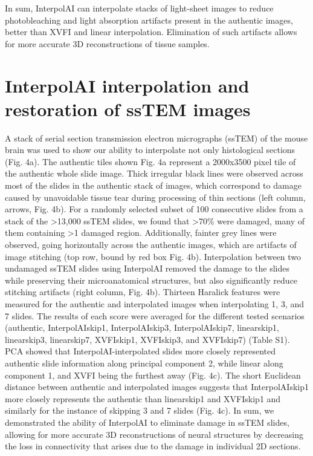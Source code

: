 \begin{refsection}
    In sum, InterpolAI can interpolate stacks of light-sheet images to reduce photobleaching and light absorption artifacts present in the authentic images, better than XVFI and linear interpolation. Elimination of such artifacts allows for more accurate 3D reconstructions of tissue samples.
    
    \section{InterpolAI interpolation and restoration of ssTEM images}
    A stack of serial section transmission electron micrographs (ssTEM) of the mouse brain was used to show our ability to interpolate not only histological sections (Fig. 4a). The authentic tiles shown Fig. 4a represent a 2000x3500 pixel tile of the authentic whole slide image. Thick irregular black lines were observed across most of the slides in the authentic stack of images, which correspond to damage caused by unavoidable tissue tear during processing of thin sections (left column, arrows, Fig. 4b). For a randomly selected subset of 100 consecutive slides from a stack of the >13,000 ssTEM slides, we found that >70\% were damaged, many of them containing >1 damaged region. Additionally, fainter grey lines were observed, going horizontally across the authentic images, which are artifacts of image stitching (top row, bound by red box Fig. 4b). 
    Interpolation between two undamaged ssTEM slides using InterpolAI removed the damage to the slides while preserving their microanatomical structures, but also significantly reduce stitching artifacts (right column, Fig. 4b).
    Thirteen Haralick features were measured for the authentic and interpolated images when interpolating 1, 3, and 7 slides. The results of each score were averaged for the different tested scenarios (authentic, InterpolAIskip1, InterpolAIskip3, InterpolAIskip7, linearskip1, linearskip3, linearskip7, XVFIskip1, XVFIskip3, and XVFIskip7) (Table S1). PCA showed that InterpolAI-interpolated slides more closely represented authentic slide information along principal component 2, while linear along component 1, and XVFI being the furthest away (Fig. 4c). The short Euclidean distance between authentic and interpolated images suggests that InterpolAIskip1 more closely represents the authentic than linearskip1 and XVFIskip1 and similarly for the instance of skipping 3 and 7 slides (Fig. 4c).
    In sum, we demonstrated the ability of InterpolAI to eliminate damage in ssTEM slides, allowing for more accurate 3D reconstructions of neural structures by decreasing the loss in connectivity that arises due to the damage in individual 2D sections.
    

\end{refsection}
